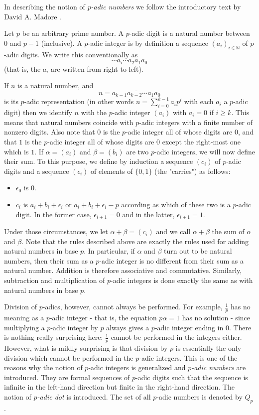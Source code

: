\documentclass{llncs}
\begin{document}
In describing the notion of {\em p-adic numbers} we follow the introductory text by David A. Madore \cite{M00}.

Let $p$ be an arbitrary prime number. A $p$-adic digit is a natural number between $0$ and $p-1$ (inclusive). A $p$-adic integer is by definition a sequence $(a_i)_{i \in \mathbb{N}}$ of $p$-adic digits. We write this conventionally as
$$
\cdots a_i \cdots  a_2 a_1 a_0
$$
(that is, the $a_i$ are written from right to left).

If $n$ is a natural number, and
$$
n = \overline{a_{k-1} a_{k-2} \cdots  a_1 a_0}
$$
is its $p$-adic representation (in other words $n = \sum ^{k-1}_{i=0}  a_ip^i$ with each $a_i$ a $p$-adic digit) then we identify $n$ with the $p$-adic integer $(a_i)$ with $a_i = 0$ if $i \geq k$. This means that natural numbers coincide with $p$-adic integers with a finite number of nonzero digits. Also note that $0$ is the $p$-adic integer all of whose digits are $0$, and that $1$ is the $p$-adic integer all of whose digits are $0$ except the right-most one which is $1$.
If $\alpha  = (a_i)$ and $\beta = (b_i)$ are two $p$-adic integers, we will now define their sum. To this purpose, we define by induction a sequence $(c_i)$ of $p$-adic digits and a sequence $(\epsilon _i)$ of elements of $\{0, 1\}$ (the "carries") as follows:


\begin{itemize}
  \item  $\epsilon _0$ is $0.$
  \item  $c_i$ is $a_i + b_i + \epsilon _i$ or $a_i + b_i + \epsilon _i - p$ according as which of these two is a $p$-adic digit. In the former case, $\epsilon _{i+1} = 0$ and in the latter, $\epsilon _{i+1} = 1.$
\end{itemize}


Under those circumstances, we let $\alpha + \beta = (c_i)$ and we call $\alpha + \beta $ the sum of $\alpha $ and $\beta $. Note that the rules described above are exactly the rules used for adding natural numbers in base $p$. In particular, if $\alpha $ and $\beta $ turn out to be natural numbers, then their sum as a $p$-adic integer is no different from their sum as a natural number. Addition is therefore associative and commutative.
Similarly, subtraction and multiplication of $p$-adic integers is done exactly the same as with natural numbers in base $p$.

Division of $p$-adics, however, cannot always be performed. For example, $\frac{1}{p}$ has no meaning as a $p$-adic integer - that is, the equation $p\alpha  = 1$  has no solution - since multiplying a $p$-adic integer by $p$ always gives a $p$-adic integer ending in $0$. There is nothing really surprising here: $\frac{1}{p}$ cannot be performed in the integers either.
However, what is mildly surprising is that division by $p$ is essentially the only division which cannot be performed in the $p$-adic integers.  This is one of the reasons why the notion of
$p$-adic integers is generalized and {\em $p$-adic numbers} are introduced. They are formal sequences of $p$-adic digits such that the sequence is infinite in the left-hand direction but finite in the right-hand direction. The notion of {\em $p$-adic dot} is introduced. The set of all $p$-adic numbers is denoted by 
$Q_p$.
\end{document}
